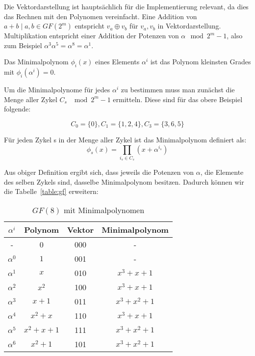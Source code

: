 Die Vektordarstellung ist hauptsächlich für die Implementierung relevant, da dies das Rechnen mit den Polynomen vereinfacht. Eine Addition von $a+b \mid a,b \in GF(2^m)$ entspricht $v_a \oplus v_b$ für $v_a,v_b$ in Vektordarstellung. Multiplikation entspricht einer Addition der Potenzen von $\alpha \mod 2^m-1$, also zum Beispiel $\alpha^3\alpha^5 = \alpha^8 = \alpha^1$.\cite[Kap. 3.2.1]{morelos2006art}

\begin{t_def}
Das Minimalpolynom $\phi_i(x)$ eines Elements $\alpha^i$ ist das Polynom kleinsten Grades mit $\phi_i(\alpha^i) = 0$.\cite[Kap 3.2.1]{morelos2006art}
\end{t_def}

Um die Minimalpolynome für jedes $\alpha^i$ zu bestimmen muss man zunächst die Menge aller Zykel $C_s$ $\mod 2^m-1$ ermitteln. Diese sind für das obere Beispiel folgende:

\begin{center}
$$C_0 = \{0\}, C_1 = \{1,2,4\}, C_3 = \{3,6,5\}$$
\end{center}

\begin{t_def}
Für jeden Zykel s in der Menge aller Zykel ist das Minimalpolynom definiert als: $$\phi_s(x) = \prod_{i_s \in C_s}(x+\alpha^{i_s})$$\cite[Kap. 3.2.1]{morelos2006art}
\end{t_def}

Aus obiger Definition ergibt sich, dass jeweils die Potenzen von $\alpha$, die Elemente des selben Zykels sind, dasselbe Minimalpolynom besitzen. Dadurch können wir die Tabelle~\ref{table:gf} erweitern:

\begin{table}[!h]
\begin{center}
\begin{tabular}{c|c|c|c}
$\alpha^i$ & Polynom & Vektor & Minimalpolynom\\
\hline
- & 0 & 000 & - \\
$\alpha^0$ & $1$ & 001 & - \\
$\alpha^1$ & $x$ & 010 & $x^3+x+1$ \\
$\alpha^2$ & $x^2$ & 100  & $x^3+x+1$ \\
$\alpha^3$ & $x+1$ & 011  & $x^3+x^2+1$ \\
$\alpha^4$ & $x^2+x$ & 110  & $x^3+x+1$ \\
$\alpha^5$ & $x^2+x+1$ & 111  & $x^3+x^2+1$ \\
$\alpha^6$ & $x^2+1$ & 101  & $x^3+x^2+1$  \\
\end{tabular}
\caption{$GF(8)$ mit Minimalpolynomen}
\label{table:minimals}
\end{center}
\end{table}

